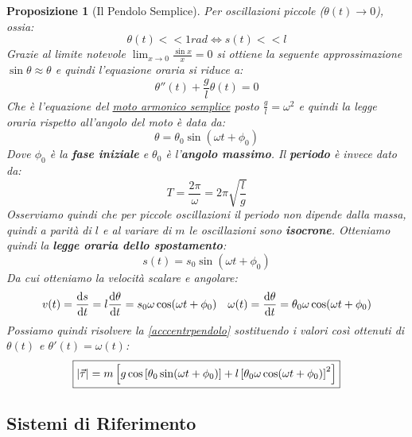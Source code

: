 \documentclass{article}
\newtheorem{prop}[defn]{Proposizione}
\begin{document}
\begin{prop}[Il Pendolo Semplice]
    Per oscillazioni piccole ($\theta(t)\to 0$), ossia:
    \[\theta(t)<<1 rad\iff s(t)<<l\]
    Grazie al limite notevole $\lim_{x\to 0}\frac{\sin x}{x}=0$ si ottiene la seguente approssimazione $\sin\theta\approx\theta$ e quindi l'equazione oraria si riduce a:
    \[\theta''(t)+\frac{g}{l}\theta(t)=0\]
    Che è l'equazione del \hyperlink{armonicosemplice}{moto armonico semplice} posto $\frac{g}{l}=\omega^2$ e quindi la legge oraria rispetto all'angolo del moto è data da:
    \begin{equation}
    \label{leggeangpendolo}
        \theta=\theta_0\sin(\omega t+\phi_0)
    \end{equation}
    Dove $\phi_0$ è la \textbf{fase iniziale} e $\theta_0$ è l'\textbf{angolo massimo}. Il \textbf{periodo} è invece dato da:
    \begin{equation}
    \label{periodopendolo}
    \boxed{T=\frac{2\pi}{\omega}=2\pi\sqrt{\frac{l}{g}}}
    \end{equation}
    Osserviamo quindi che per piccole oscillazioni il periodo non dipende dalla massa, quindi a parità di $l$ e al variare di $m$ le oscillazioni sono \textbf{isocrone}.
    Otteniamo quindi la \textbf{legge oraria dello spostamento}:
    \begin{equation}
        \boxed{s(t)=s_0\sin(\omega t+\phi_0)}
    \end{equation}
    Da cui otteniamo la velocità scalare e angolare:
    \begin{equation}
        v(t)=\dv{s}{t}=l\dv{\theta}{t}=s_0\omega\cos(\omega t+\phi_0)\quad
        \omega(t)=\dv{\theta}{t}=\theta_0\omega\cos(\omega t+\phi_0)
    \end{equation}
    Possiamo quindi risolvere la \ref{acccentrpendolo} sostituendo i valori così ottenuti di $\theta(t)$ e $\theta'(t)=\omega(t)$:
    \begin{equation}
        \boxed{|\va{\tau}|=m\left[g\cos\left[\theta_0\sin(\omega t+\phi_0)\right]+l\left[\theta_0\omega\cos(\omega t+\phi_0)\right]^2\right]}
    \end{equation}
\end{prop}

\subsection{Sistemi di Riferimento}
\end{document}
